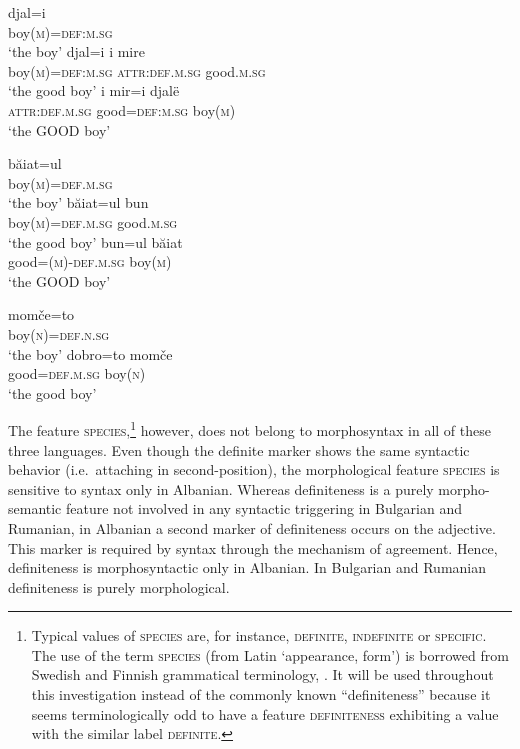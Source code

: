 \begin{exe}
\ex 
{} 
\begin{xlist}
\ex \label{definfl alb}
\gll	djal=i\\
	boy(\textsc{m})=\textsc{def:m.sg}\\
\glt	‘the boy’
\ex \label{encl alb a}
\gll	djal=i 				i 			mire\\
	boy(\textsc{m})=\textsc{def:m.sg} 	\textsc{attr:def.m.sg}	good.\textsc{m.sg}\\
\glt	‘the good boy’
\ex \label{encl alb b}
\gll	i 			mir=i 			djalë\\
	\textsc{attr:def.m.sg} 	good=\textsc{def:m.sg} 	boy(\textsc{m})\\
\glt	‘the GOOD boy’ 
\end{xlist}
\ex 
{}
\begin{xlist}
\ex \label{definfl rum}
\gll	băiat=ul\\
	boy(\textsc{m})=\textsc{def.m.sg}\\
\glt	‘the boy’
\ex \label{encl rum a}
\gll	băiat=ul 				bun\\
	boy(\textsc{m})=\textsc{def.m.sg} 	good.\textsc{m.sg}\\
\glt	‘the good boy’
\ex \label{encl rum b}
\gll	bun=ul 					băiat\\
	good=(\textsc{m})-\textsc{def.m.sg} 	boy(\textsc{m})\\
\glt	‘the GOOD boy’
\end{xlist}
\ex
{}
\begin{xlist}
\ex \label{definfl bg}
\gll	momče=to\\
	boy(\textsc{n})=\textsc{def.n.sg}\\
\glt	‘the boy’
\ex \label{encl bg}
\gll	dobro=to 		momče\\
	good=\textsc{def.m.sg}	boy(\textsc{n})\\
\glt	‘the good boy’
\end{xlist}	
\end{exe}
The feature \textsc{species},\footnote{Typical values of \textsc{species} are, for instance, \textsc{definite, indefinite} or \textsc{specific}. The use of the term \textsc{species} (from Latin ‘appearance, form’) is borrowed from Swedish and Finnish grammatical terminology, \cite[cf., e.g.][]{holm-etal1970,itkonen-t1980a}. It will be used throughout this investigation instead of the commonly known “definiteness” because it seems terminologically odd to have a feature \textsc{definiteness} exhibiting a value with the similar label \textsc{definite}.} however, does not belong to morphosyntax in all of these three languages. Even though the definite marker shows the same syntactic behavior (i.e.~attaching in second-position), the morphological feature \textsc{species} is sensitive to syntax only in Albanian. Whereas definiteness is a purely morpho-semantic feature not involved in any syntactic triggering in Bulgarian and Rumanian, in Albanian a second marker of definiteness occurs on the adjective. This marker is required by syntax through the mechanism of agreement. Hence, definiteness is morphosyntactic only in Albanian. In Bulgarian and Rumanian definiteness is purely morphological.
